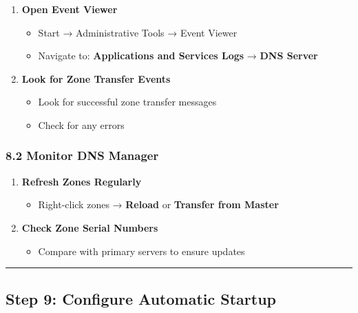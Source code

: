 \begin{enumerate}
\def\labelenumi{\arabic{enumi}.}
\tightlist
\item
  \textbf{Open Event Viewer}

  \begin{itemize}
  \tightlist
  \item
    Start → Administrative Tools → Event Viewer
  \item
    Navigate to: \textbf{Applications and Services Logs} → \textbf{DNS Server}
  \end{itemize}
\item
  \textbf{Look for Zone Transfer Events}

  \begin{itemize}
  \tightlist
  \item
    Look for successful zone transfer messages
  \item
    Check for any errors
  \end{itemize}
\end{enumerate}

\subsubsection{8.2 Monitor DNS Manager}\label{monitor-dns-manager}

\begin{enumerate}
\def\labelenumi{\arabic{enumi}.}
\tightlist
\item
  \textbf{Refresh Zones Regularly}

  \begin{itemize}
  \tightlist
  \item
    Right-click zones → \textbf{Reload} or \textbf{Transfer from Master}
  \end{itemize}
\item
  \textbf{Check Zone Serial Numbers}

  \begin{itemize}
  \tightlist
  \item
    Compare with primary servers to ensure updates
  \end{itemize}
\end{enumerate}

\begin{center}\rule{0.5\linewidth}{0.5pt}\end{center}

\subsection{Step 9: Configure Automatic Startup}\label{step-9-configure-automatic-startup}

